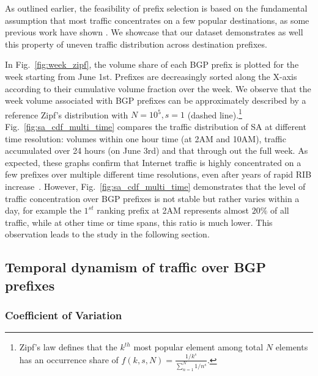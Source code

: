 As outlined earlier, the feasibility of prefix selection is based on the fundamental assumption that most traffic concentrates on a few popular destinations, as some previous work have shown \cite{Fang1999,Feamster2003, Wallerich2006}. We showcase that our dataset demonstrates as well this property of uneven traffic distribution across destination prefixes.

In Fig.~\ref{fig:week_zipf}, the volume share of each BGP prefix is plotted for the week starting from June 1st.
Prefixes are decreasingly sorted along the X-axis according to their cumulative volume fraction over the week.
We observe that the week volume associated with BGP prefixes can be approximately described by a reference Zipf's distribution with $N=10^5, s=1$ (dashed line).\footnote{Zipf's law defines that the $k^{th}$ most popular element among total $N$ elements has an occurrence share of $f(k,s,N)=\frac{1/k^s}{\sum_{n=1}^{N}1/n^s}$.} 
Fig.~\ref{fig:sa_cdf_multi_time} compares the traffic distribution of SA at different time resolution: volumes within one hour time (at 2AM and 10AM), traffic accumulated over 24 hours (on June 3rd) and that through out the full week.
As expected, these graphs confirm that Internet traffic is highly concentrated on a few prefixes over multiple different time resolutions, even after years of rapid RIB increase~\cite{potaroo}.
However, Fig.~\ref{fig:sa_cdf_multi_time} demonstrates that the level of traffic concentration over BGP prefixes is not stable but rather varies within a day, for example the $1^{st}$ ranking prefix at 2AM represents almost $20\%$ of all traffic, while at other time or time spans, this ratio is much lower. This observation leads to the study in the following section.

\subsection{Temporal dynamism of traffic over BGP prefixes}
\label{sec:dyna}

\subsubsection{Coefficient of Variation}

